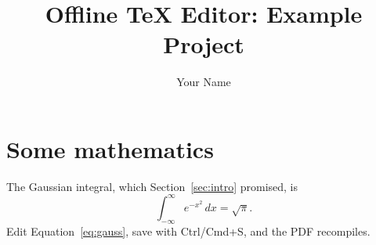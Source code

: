 \documentclass[11pt]{article}
\title{Offline TeX Editor: Example Project}
\author{Your Name}
\begin{document}
\maketitle




\section{Some mathematics}
\label{sec:math}
The Gaussian integral, which Section~\ref{sec:intro} promised, is
\begin{equation}
  \int_{-\infty}^{\infty} e^{-x^2}\,dx = \sqrt{\pi}.
  \label{eq:gauss}
\end{equation}
Edit Equation~\eqref{eq:gauss}, save with Ctrl/Cmd+S, and the PDF recompiles.



\end{document}
